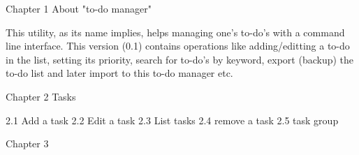 Chapter 1
About "to-do manager"

This utility, as its name implies, helps managing one's to-do's with a
command line  interface.  This version (0.1)  contains operations like
adding/editting a to-do in the  list, setting its priority, search for
to-do's by keyword, export (backup) the to-do list and later import to
this to-do manager etc.

Chapter 2
Tasks

2.1 Add a task
2.2 Edit a task
2.3 List tasks
2.4 remove a task
2.5 task group

Chapter 3
